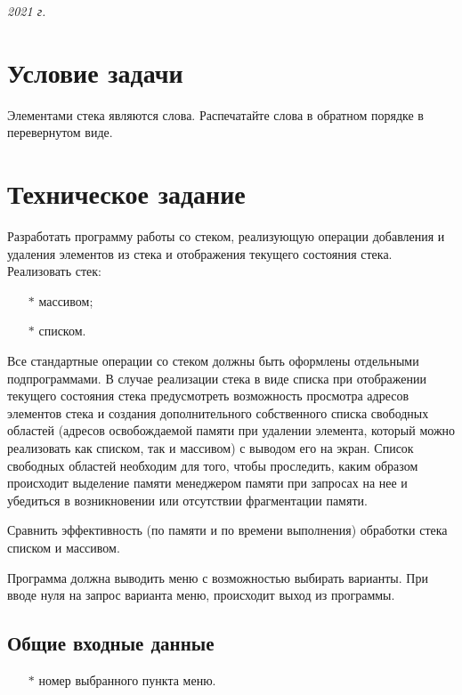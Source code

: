 \documentclass[a4paper,12pt]{extarticle}
\begin{document}
\vspace{7cm}
\begin{center} \textit{2021 г.} \end{center}
\thispagestyle{empty}
\newpage

\tableofcontents
\newpage

\section{Условие задачи}
Элементами стека являются слова. Распечатайте слова в обратном порядке в перевернутом виде.

\newpage

\section{Техническое задание}
Разработать программу работы со стеком, реализующую операции добавления и удаления элементов из стека и отображения текущего состояния стека. Реализовать стек: 

\begin{itemize}
	\item[$*$] массивом;
	\item[$*$] списком.
\end{itemize}

Все стандартные операции со стеком должны быть оформлены отдельными подпрограммами. В случае реализации стека в виде списка при отображении текущего состояния стека предусмотреть возможность просмотра адресов элементов стека и создания дополнительного собственного списка свободных областей (адресов освобождаемой памяти при удалении элемента, который можно реализовать как списком, так и массивом) с выводом его на экран. Список свободных областей необходим для того, чтобы проследить, каким образом происходит выделение памяти менеджером памяти при запросах на нее и убедиться в возникновении или отсутствии фрагментации памяти.

Сравнить эффективность (по памяти и по времени выполнения) обработки стека списком и массивом.

Программа должна выводить меню с возможностью выбирать варианты. При вводе нуля на запрос варианта меню, происходит выход из программы.

\subsection{Общие входные данные}
\begin{itemize}
    \item[$*$] номер выбранного пункта меню.
\end{itemize}
\end{document}
